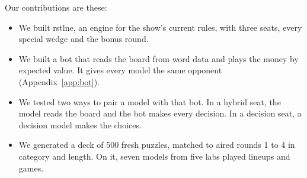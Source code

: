 Our contributions are these:
\begin{itemize}
  \item We built rstlne, an engine for the show's current rules, with three seats, every special wedge and the bonus round.
  \item We built a bot that reads the board from word data and plays the money by expected value. It gives every model the same opponent (Appendix~\ref{app:bot}).
  \item We tested two ways to pair a model with that bot. In a hybrid seat, the model reads the board and the bot makes every decision. In a decision seat, a decision model makes the choices.
  \item We generated a deck of 500 fresh puzzles, matched to aired rounds 1 to 4 in category and length. On it, seven models from five labs played \NumLineups{} lineups and \NumGames{} games.
\end{itemize}

